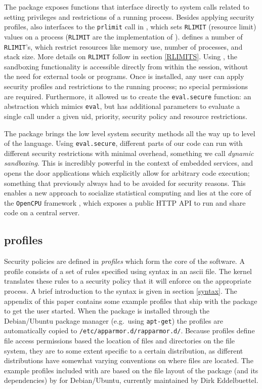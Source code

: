 The \RAppArmor package exposes \R functions that interface directly to \Linux
system calls related to setting privileges and restrictions of a running
process. Besides applying security profiles, \RAppArmor also interfaces to the
\texttt{prlimit} call in \Linux, which sets \texttt{RLIMIT} (resource limit)
values on a process (\texttt{RLIMIT} are the \Linux implementation of \ULIMIT).
\Linux defines a number of \texttt{RLIMIT}'s, which restrict resources like
memory use, number of processes, and stack size. More details on
\texttt{RLIMIT} follow in section \ref{RLIMITS}. Using \RAppArmor, the
sandboxing functionality is accessible directly from within the \R session,
without the need for external tools or programs. Once \RAppArmor is installed,
any user can apply security profiles and restrictions to the running process;
no special permissions are required. Furthermore, it allowed us to create the
\texttt{eval.secure} function: an abstraction which mimics \texttt{eval}, but
has additional parameters to evaluate a single call under a given uid,
priority, security policy and resource restrictions.

The \RAppArmor package brings the low level system security methods all the way
up to level of the \R language. Using \texttt{eval.secure}, different parts of
our code can run with different security restrictions with minimal overhead,
something we call \emph{dynamic sandboxing}. This is incredibly powerful in the
context of embedded services, and opens the door applications which explicitly
allow for arbitrary code execution; something that previously always had to be
avoided for security reasons. This enables a new approach to socialize
statistical computing and lies at the core of the \texttt{OpenCPU} framework
\citep{opencpu}, which exposes a public HTTP API to run and share \R code on a
central server.

\subsection{\AppArmor profiles}

Security policies are defined in \emph{profiles} which form the core of the
\AppArmor software. A profile consists of a set of rules specified using
\AppArmor syntax in an ascii file. The \Linux kernel translates these rules to
a security policy that it will enforce on the appropriate process. A brief
introduction to the \AppArmor syntax is given in section \ref{syntax}. The
appendix of this paper contains some example profiles that ship with the
\RAppArmor package to get the user started. When the package is installed
through the Debian/Ubuntu package manager (e.g.\ using \texttt{apt-get}) the
profiles are automatically copied to \texttt{/etc/apparmor.d/rapparmor.d/}.
Because profiles define file access permissions based the location of files and
directories on the file system, they are to some extent specific to a certain
\Linux distribution, as different distributions have somewhat varying
conventions on where files are located. The example profiles included with
\RAppArmor are based on the file layout of the  package (and its
dependencies) by \cite{batesusing} for Debian/Ubuntu, currently maintained by
Dirk Eddelbuettel.

